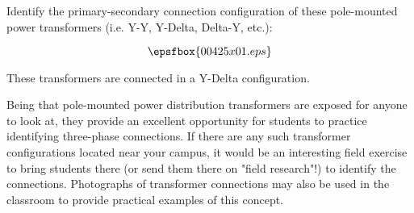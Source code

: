

Identify the primary-secondary connection configuration of these pole-mounted power transformers (i.e. Y-Y, Y-Delta, Delta-Y, etc.):

$$\epsfbox{00425x01.eps}$$







These transformers are connected in a Y-Delta configuration.







Being that pole-mounted power distribution transformers are exposed for anyone to look at, they provide an excellent opportunity for students to practice identifying three-phase connections.  If there are any such transformer configurations located near your campus, it would be an interesting field exercise to bring students there (or send them there on "field research"!) to identify the connections.  Photographs of transformer connections may also be used in the classroom to provide practical examples of this concept.




